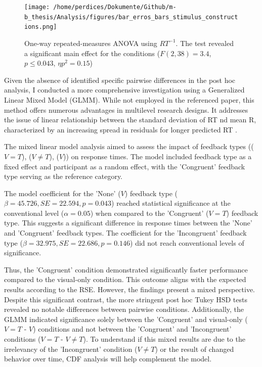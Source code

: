 \documentclass[12pt,oneside,openright]{report}
\begin{document}
\begin{figure}[!ht]
    \centering
    \texttt{[image: /home/perdices/Dokumente/Github/m-b\_thesis/Analysis/figures/bar\_erros\_bars\_stimulus\_constructions.png]}
    \caption{One-way repeated-measures ANOVA using $RT^{-1}$. The test revealed a significant main effect for the conditions ($F(2,38) = 3.4$, $p \leq 0.043$, $\eta p^2 = 0.15$)}
    \label{fig:error}
\end{figure}

Given the absence of identified specific pairwise differences in the post hoc analysis, I conducted a more comprehensive investigation using a Generalized Linear Mixed Model (GLMM). While not employed in the referenced paper, this method offers numerous advantages in multilevel research designs. It addresses the issue of linear relationship between the standard deviation of RT nd mean R, characterized by an increasing spread in residuals for longer predicted RT  \parencite{Lo2015-fv}.

The mixed linear model analysis aimed to assess the impact of feedback types (($V=T$), ($V \neq T$), ($V$)) on response times. The model included feedback type as a fixed effect and participant as a random effect, with the 'Congruent' feedback type serving as the reference category.

The model coefficient for the 'None' ($V$) feedback type ($\beta = 45.726, SE = 22.594, p = 0.043$) reached statistical significance at the conventional level ($\alpha =0.05 $) when compared to the 'Congruent' ($V=T$) feedback type. This suggests a significant difference in response times between the 'None' and 'Congruent' feedback types. The coefficient for the 'Incongruent' feedback type ($\beta = 32.975, SE = 22.686, p = 0.146$) did not reach conventional levels of significance.

Thus, the 'Congruent' condition demonstrated significantly faster performance compared to the visual-only condition. This outcome aligns with the expected results according to the RSE. However, the findings present a mixed perspective. Despite this significant contrast, the more stringent post hoc Tukey HSD tests revealed no notable differences between pairwise conditions. Additionally, the GLMM indicated significance solely between the 'Congruent' and visual-only ($V=T$ - $V$) conditions and not between the 'Congruent' and 'Incongruent' conditions ($V=T$ - $V \neq T$). To understand if this mixed results are due to the irrelevancy of the 'Incongruent' condition ($V \neq T$) or the result of changed behavior over time, CDF analysis will help complement the model.
\end{document}
